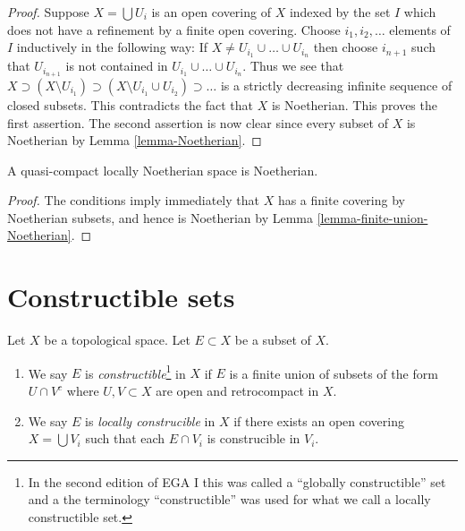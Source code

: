 \begin{proof}
Suppose $X = \bigcup U_i$ is an open covering of $X$ indexed
by the set $I$ which does not have a refinement by a finite
open covering. Choose $i_1, i_2, \ldots $ elements of $I$ inductively
in the following way: If $X \not = U_{i_1} \cup \ldots \cup U_{i_n}$
then choose $i_{n + 1}$ such that $U_{i_{n + 1}}$ is not contained
in $U_{i_1} \cup \ldots \cup U_{i_n}$. Thus we see that
$X \supset (X \setminus U_{i_1}) \supset
(X \setminus U_{i_1} \cup U_{i_2}) \supset \ldots$ is a strictly
decreasing infinite sequence of closed subsets. This contradicts
the fact that $X$ is Noetherian. This proves the first assertion.
The second assertion is now clear since every subset of $X$ is Noetherian by
Lemma \ref{lemma-Noetherian}.
\end{proof}

\begin{lemma}
\label{lemma-quasi-compact-locally-Noetherian-Noetherian}
A quasi-compact locally Noetherian space is Noetherian.
\end{lemma}

\begin{proof}
The conditions imply immediately that $X$ has a finite covering by
Noetherian subsets, and hence is Noetherian by
Lemma \ref{lemma-finite-union-Noetherian}.
\end{proof}




\section{Constructible sets}
\label{section-constructible}

\begin{definition}
\label{definition-constructible}
Let $X$ be a topological space. Let $E \subset X$ be a subset of $X$.
\begin{enumerate}
\item We say $E$ is {\it constructible}\footnote{In the second edition
of EGA I \cite{EGA1-second} this was called a ``globally constructible''
set and a the terminology ``constructible'' was used for what we call a locally
constructible set.}
in $X$ if $E$ is a finite union
of subsets of the form $U \cap V^c$ where $U, V \subset X$ are open and
retrocompact in $X$.
\item We say $E$ is {\it locally construcible} in $X$ if there exists an open
covering $X = \bigcup V_i$ such that each $E \cap V_i$ is construcible
in $V_i$.
\end{enumerate}
\end{definition}

